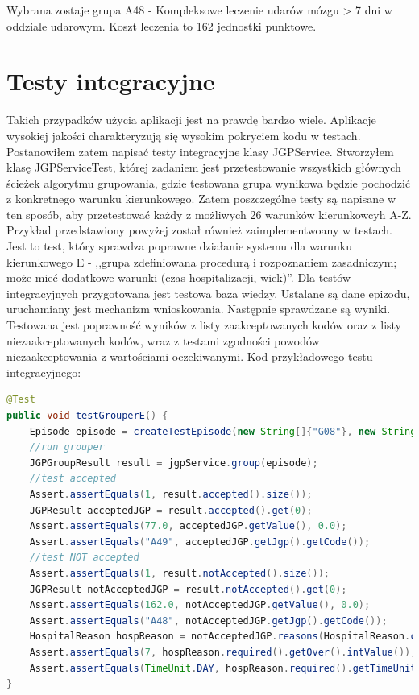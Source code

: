 Wybrana zostaje grupa A48 - Kompleksowe leczenie udarów mózgu > 7 dni w oddziale udarowym. Koszt leczenia to 162 jednostki punktowe.


\section{Testy integracyjne}
\label{sec:testyIntegracyjne}

Takich przypadków użycia aplikacji jest na prawdę bardzo wiele. Aplikacje wysokiej jakości charakteryzują się wysokim pokryciem kodu w testach. Postanowiłem zatem napisać testy integracyjne klasy JGPService. Stworzyłem klasę JGPServiceTest, której zadaniem jest przetestowanie wszystkich głównych ścieżek algorytmu grupowania, gdzie testowana grupa wynikowa będzie pochodzić z konkretnego warunku kierunkowego. Zatem poszczególne testy są napisane w ten sposób, aby przetestować każdy z możliwych 26 warunków kierunkowcyh A-Z.
Przykład przedstawiony powyżej został również zaimplementwoany w testach. Jest to test, który sprawdza poprawne działanie systemu dla warunku kierunkowego E - ,,grupa zdefiniowana procedurą i rozpoznaniem zasadniczym; może mieć dodatkowe warunki (czas hospitalizacji, wiek)''.
Dla testów integracyjnych przygotowana jest testowa baza wiedzy. Ustalane są dane epizodu, uruchamiany jest mechanizm wnioskowania. Następnie sprawdzane są wyniki. Testowana jest poprawność wyników z listy zaakceptowanych kodów oraz z listy niezaakceptowanych kodów, wraz z testami zgodności powodów niezaakceptowania z wartościami oczekiwanymi.
Kod przykładowego testu integracyjnego:

\begin{lstlisting}[language=Java]
@Test
public void testGrouperE() {
    Episode episode = createTestEpisode(new String[]{"G08"}, new String[]{"88.714"}, 7, 75);
    //run grouper
    JGPGroupResult result = jgpService.group(episode);
    //test accepted
    Assert.assertEquals(1, result.accepted().size());
    JGPResult acceptedJGP = result.accepted().get(0);
    Assert.assertEquals(77.0, acceptedJGP.getValue(), 0.0);
    Assert.assertEquals("A49", acceptedJGP.getJgp().getCode());
    //test NOT accepted
    Assert.assertEquals(1, result.notAccepted().size());
    JGPResult notAcceptedJGP = result.notAccepted().get(0);
    Assert.assertEquals(162.0, notAcceptedJGP.getValue(), 0.0);
    Assert.assertEquals("A48", notAcceptedJGP.getJgp().getCode());
    HospitalReason hospReason = notAcceptedJGP.reasons(HospitalReason.class).get(0);
    Assert.assertEquals(7, hospReason.required().getOver().intValue());
    Assert.assertEquals(TimeUnit.DAY, hospReason.required().getTimeUnit());
}
\end{lstlisting}


